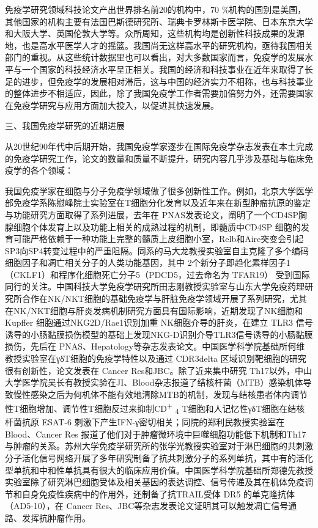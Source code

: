 免疫学研究领域科技论文产出世界排名前20的机构中，70
\%机构的国别是美国，其他国家的机构主要有法国巴斯德研究所、瑞典卡罗林斯卡医学院、日本东京大学和大阪大学、英国伦敦大学等。众所周知，这些机构均是创新性科技成果的发源地，也是高水平医学人才的摇篮。我国尚无这样高水平的研究机构，亟待我国相关部门的重视。从这些统计数据里也可以看出，对大多数国家而言，免疫学的发展水平与一个国家的科技经济水平呈正相关。我国的经济和科技事业在近年来取得了长足的进步，但免疫学的发展相对滞后，这与中国的经济实力不相称，也与科技事业的整体进步不相适应，因此，除了我国免疫学工作者需要加倍努力外，还需要国家在免疫学研究与应用方面加大投入，以促进其快速发展。

\begin{center}
{\large 三、我国免疫学研究的近期进展}
\end{center}

从20世纪90年代中后期开始，我国免疫学家逐步在国际免疫学杂志发表在本土完成的免疫学研究工作，论文的数量和质量不断提升，研究内容几乎涉及基础与临床免疫学的各个领域：

我国免疫学家在细胞与分子免疫学领域做了很多创新性工作。例如，北京大学医学部免疫学系陈慰峰院士实验室在T细胞分化发育以及近年来在新型肿瘤抗原的鉴定与功能研究方面取得了系列进展，去年在
PNAS发表论文，阐明了一个CD4SP胸腺细胞个体发育上以及功能上相关的成熟过程的机制，即髓质中CD4SP
细胞的发育可能严格依赖于一种功能上完整的髓质上皮细胞小室，Relb和Aire突变会引起SP3向SP4转变过程中的严重阻隔。同系的马大龙教授实验室自主克隆了多个编码细胞因子和凋亡相关分子的人类功能基因，其中
2个新分子即趋化素样因子1（CKLF1）和程序化细胞死亡分子5（PDCD5，过去命名为
TFAR19）
受到国际同行的关注。中国科技大学免疫学研究所田志刚教授实验室与山东大学免疫药理研究所合作在NK/NKT细胞的基础免疫学与肝脏免疫学领域开展了系列研究，尤其在NK/NKT细胞与肝炎发病机制研究方面具有国际影响，近期发现了NK细胞和Kupffer
细胞通过NKG2D/Rae1识别加重 NK细胞介导的肝炎，在建立 TLR3
信号诱导的小肠黏膜损伤模型的基础上发现NKG-D识别介导TLR3信号诱导的小肠黏膜损伤，先后在
PNAS、Hepatology等杂志发表论文。中国医学科学院基础所何维教授实验室在γδT细胞的免疫学特性以及通过
CDR3delta 区域识别靶细胞的研究很有创新性，论文发表在 Cancer
Res和JBC。除了近来集中研究
Th17以外，中山大学医学院吴长有教授实验在JI、Blood杂志报道了结核杆菌（MTB）感染机体导致慢性感染之后为何机体不能有效地清除MTB的机制，发现与结核患者体内调节性T细胞增加、调节性T细胞反过来抑制CD\textsuperscript{+}
\textsubscript{4} T细胞和人记忆性γδT细胞在结核杆菌抗原 ESAT-6
刺激下产生IFN-γ密切相关；同院的郑利民教授实验室在Blood、Cancer Res
报道了他们对于肿瘤微环境中巨噬细胞功能低下机制和Th17与肿瘤的关系。苏州大学免疫学研究所的张学光教授实验室对于淋巴细胞的共刺激分子活化信号网络开展了多年研究制备了抗共刺激分子的系列单抗，其中有的活化型单抗和中和性单抗具有很大的临床应用价值。中国医学科学院基础所郑德先教授实验室除了研究淋巴细胞受体及相关基因的表达调控、信号传递及其在机体免疫调节和自身免疫性疾病中的作用外，还制备了抗TRAIL受体
DR5 的单克隆抗体（AD5-10），在 Cancer
Res、JBC等杂志发表论文证明其可以触发凋亡信号通路、发挥抗肿瘤作用。

